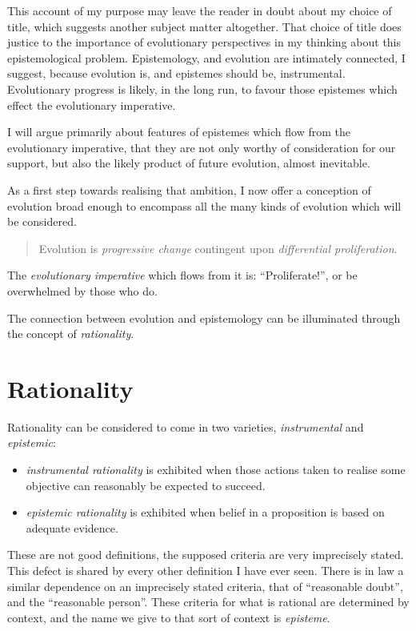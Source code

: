 This account of my purpose may leave the reader in doubt about my choice of title, which suggests another subject matter altogether.
That choice of title does justice to the importance of evolutionary perspectives in my thinking about this epistemological problem.
Epistemology, and evolution are intimately connected, I suggest, because evolution is, and epistemes should be, instrumental.
Evolutionary progress is likely, in the long run, to favour those epistemes which effect the evolutionary imperative.

I will argue primarily about features of epistemes which flow from the evolutionary imperative, that they are not only worthy of consideration for our support, but also the likely product of future evolution, almost inevitable.

As a first step towards realising that ambition, I now offer a conception of evolution broad enough to encompass all the many kinds of evolution which will be considered.


\begin{quote}
Evolution is \emph{progressive change} contingent upon \emph{differential proliferation}.
\end{quote}

The \emph{evolutionary imperative} which flows from it is: ``Proliferate!'', or be overwhelmed by those who do.

The connection between evolution and epistemology can be illuminated through the concept of \emph{rationality}.

\section{Rationality}

Rationality can be considered to come in two varieties, \emph{instrumental} and  \emph{epistemic}:

\begin{itemize}
\item[]\emph{instrumental rationality} is exhibited when those actions taken to realise some objective can reasonably be expected to succeed.
\item[]\emph{epistemic rationality} is exhibited when belief in a proposition is based on adequate evidence.
\end{itemize}

These are not good definitions, the supposed criteria are very imprecisely stated.
This defect is shared by every other definition I have ever seen.
There is in law a similar dependence on an imprecisely stated criteria, that of ``reasonable doubt'', and the ``reasonable person''.
These criteria for what is rational are determined by context, and the name we give to that sort of context is \emph{episteme}.


